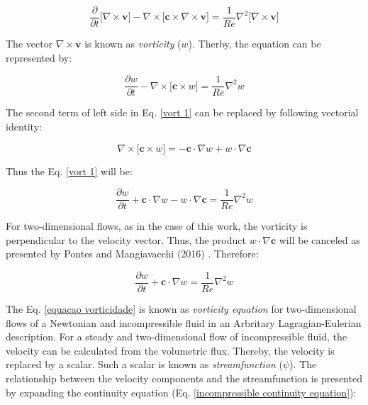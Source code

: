 \begin{equation}
 \frac{\partial}{\partial t} \big[ \nabla \times \textbf{v} \big]
 - 
 \nabla \times \big[ \textbf{c} \times \nabla \times \textbf{v} \big]
 =
 \frac{1}{Re} \nabla^{2} \big[ \nabla \times \textbf{v} \big]
\end{equation}

\medskip
The vector $\nabla \times \textbf{v}$ is known as
\textit{vorticity} ($w$).
Therby, the equation can be represented by:

\begin{equation} \label{vort 1}
 \frac{\partial w}{\partial t}
 - 
 \nabla \times \big[ \textbf{c} \times w \big]
 =
 \frac{1}{Re} \nabla^{2} w
\end{equation}

\medskip
The second term of left side in 
Eq. \ref{vort 1}
can be replaced by following vectorial identity:


\begin{equation}
 \nabla \times \big[ \textbf{c} \times w \big]
 =
 -
 \textbf{c} \cdot \nabla w
 +
 w \cdot \nabla \textbf{c}
\end{equation}

\medskip
\noindent
Thus the Eq. \ref{vort 1} will be:

\begin{equation} \label{vort 2}
 \frac{\partial w}{\partial t}
 +
 \textbf{c} \cdot \nabla w
 - 
 w \cdot \nabla \textbf{c}
 =
 \frac{1}{Re} \nabla^{2} w
\end{equation}

\medskip
For two-dimensional flows, as in the case of this work,
 the vorticity is perpendicular to the velocity vector.
 Thus, the product $w \cdot \nabla \textbf{c}$ will be canceled
 as presented by Pontes and Mangiavacchi (2016) \cite{pontes2016}.
 Therefore:

\begin{equation} \label{equacao vorticidade}
 \frac{\partial w}{\partial t}
 +
 \textbf{c} \cdot \nabla w
 =
 \frac{1}{Re} \nabla^{2} w
\end{equation}

\medskip
The Eq. \ref{equacao vorticidade} is known as
 \textit{vorticity equation} for two-dimensional flows of
 a Newtonian and incompressible fluid in an Arbritary
 Lagragian-Eulerian description. For a steady and 
 two-dimensional flow of incompressible fluid,
 the velocity can be calculated from the volumetric flux.
 Thereby, the velocity is replaced by a scalar.
 Such a scalar is known as \textit{streamfunction} ($\psi$).
 The relationship between the velocity components and
 the streamfunction is presented by expanding the
 continuity equation (Eq. \ref{incompressible continuity equation}):


